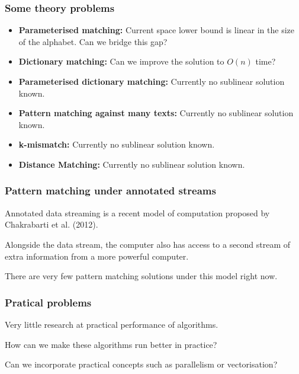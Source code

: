 \documentclass{beamer}
\begin{document}
\begin{frame}
\frametitle{Some theory problems}
\begin{itemize}
    \item\textbf{Parameterised matching:} Current space lower bound is linear in the size of the alphabet. Can we bridge this gap?
    \item\textbf{Dictionary matching:} Can we improve the solution to $O(n)$ time?
    \item\textbf{Parameterised dictionary matching:} Currently no sublinear solution known.
    \item\textbf{Pattern matching against many texts:} Currently no sublinear solution known.
    \item\textbf{k-mismatch:} Currently no sublinear solution known.
    \item\textbf{Distance Matching:} Currently no sublinear solution known.
\end{itemize}
\end{frame}


\begin{frame}
\frametitle{Pattern matching under annotated streams}
Annotated data streaming is a recent model of computation proposed by Chakrabarti et al. (2012).

Alongside the data stream, the computer also has access to a second stream of extra information from a more powerful computer.

There are very few pattern matching solutions under this model right now.
\end{frame}


\begin{frame}
\frametitle{Pratical problems}
Very little research at practical performance of algorithms.

How can we make these algorithms run better in practice?

Can we incorporate practical concepts such as parallelism or vectorisation?
\end{frame}

\end{document}
